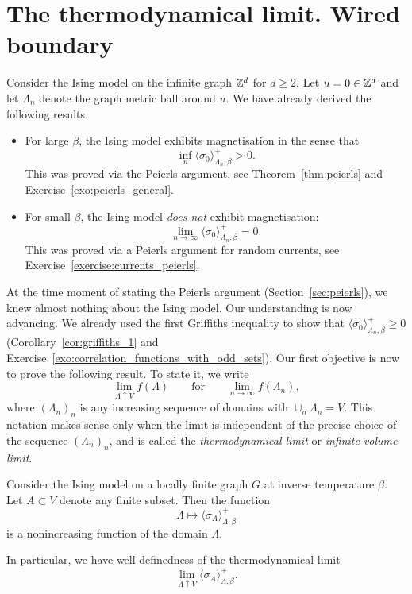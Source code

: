\section{The thermodynamical limit. Wired boundary}
\label{sec:infinite_volume}

Consider the Ising model on the infinite graph $\mathbb Z^d$ for $d\geq 2$.
Let $u=0\in\mathbb Z^d$ and let $\Lambda_n$ denote the graph metric ball around $u$.
We have already derived the following results.
\begin{itemize}
    \item For large $\beta$,
    the Ising model exhibits magnetisation
    in the sense that
    \[
        \inf_{n}\langle\sigma_0\rangle_{\Lambda_n,\beta}^+
        >0.
    \]
    This was proved via the Peierls argument, see Theorem~\ref{thm:peierls}
    and Exercise~\ref{exo:peierls_general}.
    \item For small $\beta$,
    the Ising model \emph{does not} exhibit magnetisation:
    \[
        \lim_{n\to\infty}\langle\sigma_0\rangle_{\Lambda_n,\beta}^+
        =0.
    \]
    This was proved via a Peierls argument for random currents,
    see Exercise~\ref{exercise:currents_peierls}.
\end{itemize}
At the time moment of stating the Peierls argument (Section~\ref{sec:peierls}),
we knew almost nothing about the Ising model.
Our understanding is now advancing.
We already used the first Griffiths inequality to show that $\langle\sigma_0\rangle_{\Lambda_n,\beta}^+\geq 0$
(Corollary~\ref{cor:griffiths_1}
and Exercise~\ref{exo:correlation_functions_with_odd_sets}).
Our first objective is now to prove the following result.
To state it, we write
\[
    \lim_{\Lambda\uparrow V}f(\Lambda)
    \qquad\text{for}\qquad
    \lim_{n\to\infty}f(\Lambda_n),
\]
where $(\Lambda_n)_n$ is any increasing sequence of domains 
with $\cup_n\Lambda_n=V$.
This notation makes sense only when the limit is independent
of the precise choice of the sequence $(\Lambda_n)_n$,
and is called the \emph{thermodynamical limit} or \emph{infinite-volume limit}.

\begin{lemma}
    \label{lemma:correlation_functions_monotone}
    Consider the Ising model on a locally finite graph
    $G$ at inverse temperature $\beta$.
    Let $A\subset V$ denote any finite subset.
    Then the function
    \[
        \Lambda\mapsto
        \langle\sigma_A\rangle_{\Lambda,\beta}^+
    \]
    is a nonincreasing function of the domain $\Lambda$.

    In particular, we have well-definedness of the thermodynamical limit
    \[
        \lim_{\Lambda\uparrow V}
        \langle\sigma_A\rangle_{\Lambda,\beta}^+.
    \]
\end{lemma}

